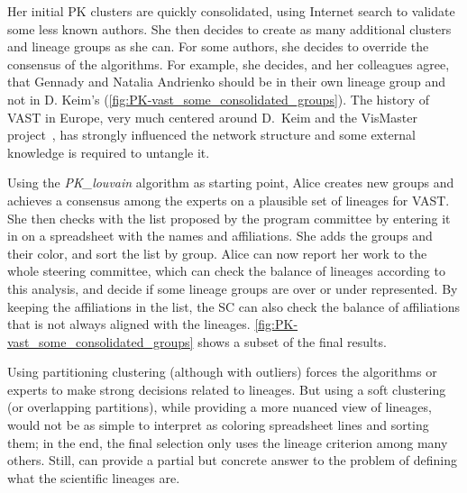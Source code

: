 Her initial PK clusters are quickly consolidated, using Internet search to validate some less known authors. She then decides to create as many additional clusters and lineage groups as she can.
For some authors, she decides to override the consensus of the algorithms. For example, she decides, and her colleagues agree, that Gennady and Natalia Andrienko should be in their own lineage group and not in D. Keim's (\autoref{fig:PK-vast_some_consolidated_groups}). The history of VAST in Europe, very much centered around D.\ Keim and the VisMaster project~\cite{VisMaster}, has strongly influenced the network structure and some external knowledge is required to untangle it.

Using the \emph{PK\_louvain} algorithm as starting point, Alice creates new groups and achieves a consensus among the experts on a plausible set of lineages for VAST.
She then checks with the list proposed by the program committee by entering it in on a spreadsheet with the names and affiliations. She adds the groups and their color, and sort the list by group.
Alice can now report her work to the whole steering committee, which can check the balance of lineages according to this analysis, and decide if some lineage groups are over or under represented.  By keeping the affiliations in the list, the SC can also check the balance of affiliations that is not always aligned with the lineages.
\autoref{fig:PK-vast_some_consolidated_groups} shows a subset of the final results.


Using partitioning clustering (although with outliers) forces the algorithms or experts to make strong decisions related to lineages. But using a soft clustering (or overlapping partitions), while providing a more nuanced view of lineages, would not be as simple to interpret as coloring spreadsheet lines and sorting them;
in the end, the final selection only uses the lineage criterion among many others. Still, \pkclustering can provide a partial but concrete answer to the problem of defining what the scientific lineages are.

